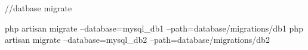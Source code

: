 //datbase migrate

php artisan migrate --database=mysql_db1 --path=database/migrations/db1
php artisan migrate --database=mysql_db2 --path=database/migrations/db2

